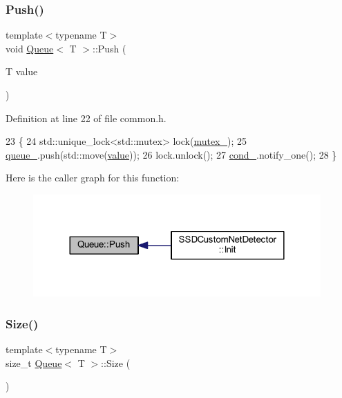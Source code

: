 \subsubsection{\texorpdfstring{Push()}{Push()}}
{\footnotesize\ttfamily template$<$typename T$>$ \\
void \mbox{\hyperlink{class_queue}{Queue}}$<$ T $>$\+::Push (\begin{DoxyParamCaption}\item[{T}]{value }\end{DoxyParamCaption})\hspace{0.3cm}{\ttfamily [inline]}}



Definition at line 22 of file common.\+h.


\begin{DoxyCode}
23     \{
24         std::unique\_lock<std::mutex> lock(\mbox{\hyperlink{class_queue_ad341bfdf4d075ed6ab4807da10e703cd}{mutex\_}});
25         \mbox{\hyperlink{class_queue_a60e7a5aba900b055cd0668755c0dfadd}{queue\_}}.push(std::move(\mbox{\hyperlink{struct_g_m_l__pair_aef8797e7d2fc0d2e2f628ce9c2783a6c}{value}}));
26         lock.unlock();
27         \mbox{\hyperlink{class_queue_aeb109ed25687457524a70b03a2584b6d}{cond\_}}.notify\_one();
28     \}
\end{DoxyCode}
Here is the caller graph for this function\+:\nopagebreak
\begin{figure}[H]
\begin{center}
\leavevmode
\includegraphics[width=312pt]{class_queue_ace62235edaffc6f375d040c32c0ab651_icgraph}
\end{center}
\end{figure}
\mbox{\label{class_queue_a5e59f2b97d5dea8ad0314b6239816055}} 
\subsubsection{\texorpdfstring{Size()}{Size()}}
{\footnotesize\ttfamily template$<$typename T$>$ \\
size\+\_\+t \mbox{\hyperlink{class_queue}{Queue}}$<$ T $>$\+::Size (\begin{DoxyParamCaption}{ }\end{DoxyParamCaption})\hspace{0.3cm}{\ttfamily [inline]}}



